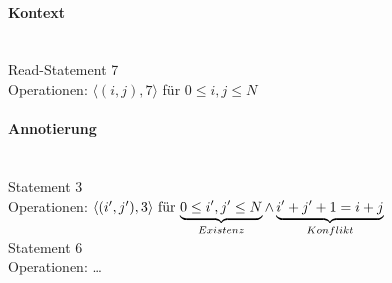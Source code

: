 \paragraph{Kontext}~\\
Read-Statement 7\\
Operationen: $\langle (i,j), 7 \rangle$ für $0 \leq i, j \leq N$

\paragraph{Annotierung}~\\
Statement 3\\
Operationen: $\langle (i^\prime,j^\prime), 3 \rangle\) für \( \underbrace{0 \leq i^\prime, j^\prime \leq N}_{Existenz} \land \underbrace{i^\prime + j^\prime + 1 = i + j}_{Konflikt}$\\
Statement 6\\
Operationen: \dots\\

